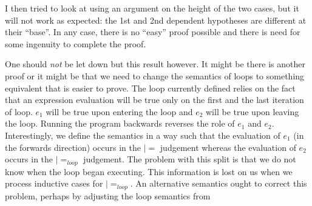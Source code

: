 I then tried to look at using an argument on the height of the two
cases, but it will not work as expected: the 1st and 2nd dependent
hypotheses are different at their ``base''.  In any case, there is no
``easy'' proof possible and there is need for some ingenuity to
complete the proof.

One should \emph{not} be let down but this result however. It might be
there is another proof or it might be that we need to change the
semantics of loops to something equivalent that is easier to
prove. The loop currently defined relies on the fact that an
expression evaluation will be true only on the first and the last
iteration of loop. $e_1$ will be true upon entering the loop and $e_2$
will be true upon leaving the loop. Running the program backwards
reverses the role of $e_1$ and $e_2$. Interestingly, we define the
semantics in a way such that the evaluation of $e_1$ (in the forwards
direction) occurs in the $|=$ judgement whereas the evaluation of
$e_2$ occurs in the $|=_{loop}$ judgement. The problem with this split
is that we do not know when the loop began executing. This information
is lost on us when we process inductive cases for $|=_{loop}$. An
alternative semantics ought to correct this problem, perhaps by
adjusting the loop semantics from \cite{yokoyama.gluck:reversible}


